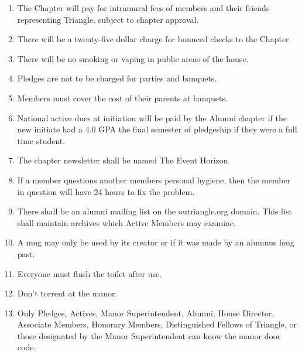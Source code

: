 \begin{enumerate}
\item The Chapter will pay for intramural fees of members and their friends representing Triangle, subject to chapter approval. 
\item There will be a twenty-five dollar charge for bounced checks to the Chapter. 
\item There will be no smoking or vaping in public areas of the house.  
\item Pledges are not to be charged for parties and banquets.  
\item Members must cover the cost of their parents at banquets.  
\item National active dues at initiation will be paid by the Alumni chapter if the new initiate had a 4.0 GPA the final semester of pledgeship if they were a full time student.
\item The chapter newsletter shall be named The Event Horizon. 
\item If a member questions another members personal hygiene, then the member in question will have 24 hours to fix the problem.
\item There shall be an alumni mailing list on the outriangle.org domain. This list shall maintain archives which Active Members may examine.
\item A mug may only be used by its creator or if it was made by an alumnus long past.
\item Everyone must flush the toilet after use.
\item Don’t torrent at the manor.
\item Only Pledges, Actives, Manor Superintendent, Alumni, House Director, Associate Members, Honorary Members, Distinguished Fellows of Triangle, or those designated by the Manor Superintendent can know the manor door code.
\end{enumerate}
